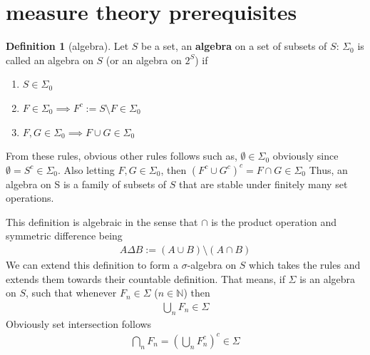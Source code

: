 \documentclass[12pt]{article}
\theoremstyle{definition}
\newtheorem{definition}{Definition}[section]
\begin{document}
\listoftheorems
\section{measure theory prerequisites}

\begin{definition}[algebra]
	Let $S$ be a set, an \textbf{algebra} on a set of subsets of $S$: $\Sigma_0$ is called an algebra on $S$ (or an algebra on $2^S$) if 
	\begin{enumerate}
		\item $S \in \Sigma_0$ 
	\item $F \in \Sigma_0 \implies F^c := S\setminus F \in \Sigma_0$ 
	\item $F, G \in \Sigma_0 \implies F \cup G \in \Sigma_0$ 
		
	\end{enumerate}
	From these rules, obvious other rules follows such as, $\emptyset \in \Sigma_0$ obviously since $\emptyset = S^c \in \Sigma_0$. Also letting $F, G \in \Sigma_0$, then $(F^c \cup G^c)^c = F\cap G \in \Sigma_0$ 
	Thus, an algebra on S is a family of subsets of $S$ that are stable under finitely many set operations.
\end{definition}
This definition is algebraic in the sense that $\cap$ is the product operation and symmetric difference being 
\begin{align*}
	A \Delta B := (A \cup B)\setminus(A \cap B)
\end{align*}
We can extend this definition to form a $\sigma$-algebra on $S$ which takes the rules and extends them towards their countable definition. That means, if $\Sigma$ is an algebra on $S$, such that whenever $F_n \in \Sigma$ ($n \in \mathbb{N}$) then 
\begin{align*}
	\bigcup_{n} F_n \in \Sigma
\end{align*}
Obviously set intersection follows
\begin{align*}
	\bigcap_n F_n = \left( \bigcup_n F_n^c \right)^c \in \Sigma
\end{align*}
\end{document}
